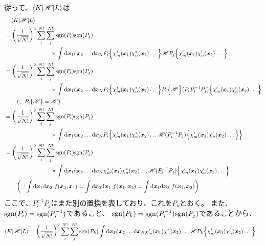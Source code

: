従って、$\braket{K|\mathscr{H}|L}$は
\begin{align}
&\quad
	\braket{K|\mathscr{H}|L} \nonumber \\
&=
	\left(
		\frac{1}{\sqrt{N!}}
	\right)^2
	\sum_i^{N!}
	\sum_j^{N!}
		\sgn(P_i)
		\sgn(P_j) \nonumber \\ &\qquad\qquad\qquad\qquad \times
		\int \d\x_1 \d\x_2 \dots \d\x_N
			P_i\Bigl\{
				\chi_m^\ast(\x_1) \chi_n^\ast(\x_2) \dots
			\Bigr\}
			\mathscr{H}
			P_j\Bigl\{
				\chi_m'(\x_1) \chi_n'(\x_2) \dots
			\Bigr\} \\
%
%
&=
	\left(
		\frac{1}{\sqrt{N!}}
	\right)^2
	\sum_i^{N!}
	\sum_j^{N!}
		\sgn(P_i)
		\sgn(P_j) \nonumber \\ &\qquad\qquad\qquad\qquad \times
		\int \d\x_1 \d\x_2 \dots \d\x_N
			P_i\Bigl\{
				\chi_m^\ast(\x_1) \chi_n^\ast(\x_2) \dots
			\Bigr\}
			P_i\Bigl\{
				\mathscr{H}
			\Bigr\}
			(P_iP_i^{-1}P_j)\Bigl\{
				\chi_m'(\x_1) \chi_n'(\x_2) \dots
			\Bigr\} \\
	&\qquad
	\left(
		\because P_i\{\mathscr{H}\} = \mathscr{H}
	\right) \nonumber \\
%
%
&=
	\left(
		\frac{1}{\sqrt{N!}}
	\right)^2
	\sum_i^{N!}
	\sum_j^{N!}
		\sgn(P_i)
		\sgn(P_j) \nonumber \\ &\qquad\qquad\qquad\qquad \times
		\int \d\x_1 \d\x_2 \dots \d\x_N
			P_i\Bigl\{
				\chi_m^\ast(\x_1) \chi_n^\ast(\x_2) \dots
				\mathscr{H}
				(P_i^{-1}P_j)\Bigl\{
					\chi_m'(\x_1) \chi_n'(\x_2) \dots
				\Bigr\}
			\Bigr\} \\
%
%
&=
	\left(
		\frac{1}{\sqrt{N!}}
	\right)^2
	\sum_i^{N!}
	\sum_j^{N!}
		\sgn(P_i)
		\sgn(P_j) \nonumber \\ &\qquad\qquad\qquad\qquad \times
		\int \d\x_1 \d\x_2 \dots \d\x_N
			\chi_m^\ast(\x_1) \chi_n^\ast(\x_2) \dots
			\mathscr{H}
			(P_i^{-1}P_j)\Bigl\{
				\chi_m'(\x_1) \chi_n'(\x_2) \dots
			\Bigr\} \\
	&\qquad
	\left(
		\because \int\d\x_1\d\x_2\ f(\x_2,\x_1) = \int\d\x_2\d\x_1\ f(\x_1,\x_2) = \int\d\x_1\d\x_2\ f(\x_1,\x_2)
	\right) \nonumber
\end{align}
ここで、$P_i^{-1}P_j$はまた別の置換を表しており、これを$P_k$とおく。
また、${\rm sgn}(P_i)={\rm sgn}(P_i^{-1})$であること、
${\rm sgn}(P_k)={\rm sgn}(P_i^{-1}){\rm sgn}(P_j)$であることから、
\begin{align}
	\braket{K|\mathscr{H}|L}
&=
	\left(
		\frac{1}{\sqrt{N!}}
	\right)^2
	\sum_i^{N!}
	\sum_j^{N!}
		{\rm sgn}(P_k)
		\int {\ensuremath{\rm d}}{\ensuremath{\bm{x}}}_1 {\rm d}{\bm{x}}_2 \dots {\ensuremath{\rm d}}{\ensuremath{\bm{x}}}_N
			\chi_m^\ast({\bm{x}}_1) \chi_n^\ast({\bm{x}}_2) \dots
			\mathscr{H}
			P_k\Bigl\{
				\chi_m'({\bm{x}}_1) \chi_n'({\bm{x}}_2) \dots
			\Bigr\}
\end{align}
